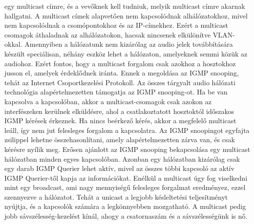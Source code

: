 egy multicast címre, és a vevőknek kell tudniuk, melyik multicast címre akarnak
hallgatni. A multicast címek alapvetően nem kapcsolódnak alhálózatokhoz, mivel nem
kapcsolódnak a csomópontokhoz és az IP-címekhez. Ezért a multicast csomagok
áthaladnak az alhálózatokon, hacsak nincsenek elkülönítve VLAN-okkal. 
Amennyiben a hálózatunk nem kizárólag az audio jelek továbbítására 
készült speciálisan, néhány eszköz lehet a hálózaton, amelyeknek semmi közük az audiohoz.
Ezért fontos, hogy a multicast forgalom csak
azokhoz a hosztokhoz jusson el, amelyek érdeklődnek iránta. 
Ennek a megoldása az IGMP snooping, tehát az Internet Csoportkezelési Protokoll. 
Az összes tárgyalt audio hálózati technológia alapértelmezetten
támogatja az IGMP snooping-ot. Ha be van kapcsolva a kapcsolóban, akkor a
multicast-csomagok csak azokon az interfészeken kerülnek elküldésre, ahol a
csatlakoztatott hosztoktól időszakos IGMP kérések érkeznek. Ha nincs beérkező
kérés, akkor a megfelelő multicast leáll, így nem jut felesleges forgalom a
kapcsolatra. Az IGMP snoopingot egyfajta zsilippel lehetne összehasonlítani,
amely alapértelmezetten zárva van, és csak kérésre nyílik meg. Erősen ajánlott
az IGMP snooping bekapcsolása egy multicast hálózatban minden egyes kapcsolóban.
Azonban egy hálózatban kizárólag csak egy darab IGMP Querier lehet aktív, mivel az
összes többi kapcsoló az aktív IGMP Querier-től kapja az információkat.
Enélkül a multicast úgy fog viselkedni mint egy broadcast, ami nagy mennyiségű
felesleges forgalmat eredményez, ezzel szennyezve a hálózatot.
Tehát a unicast a legjobb késleltetési teljesítményt nyújtja, és a
kapcsolók számára a legkönnyebben mozgatható.
A multicast pedig jobb sávszélesség-kezelést kínál, ahogy a csatornaszám és a sávszélességünk is nő.

